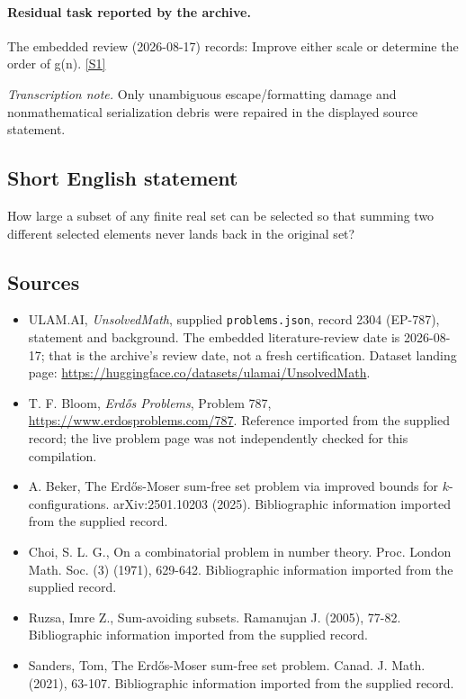 \documentclass[11pt,a4paper]{article}
\newcommand{\sref}[2]{\hyperlink{source:#1:#2}{[S#2]}}
\begin{document}
\paragraph{Residual task reported by the archive.}

The embedded review (2026-08-17) records: Improve either scale or determine the order of g(n). \sref{2304}{1}

{\small\emph{Transcription note.} Only unambiguous escape/formatting damage and nonmathematical serialization debris were repaired in the displayed source statement.}

\subsection{Short English statement}

How large a subset of any finite real set can be selected so that summing two different selected elements never lands back in the original set?

\subsection{Sources}

{\small

\begin{itemize}

\item[\hypertarget{source:2304:1}{S1}] ULAM.AI, \emph{UnsolvedMath}, supplied \texttt{problems.json}, record 2304 (EP-787), statement and background. The embedded literature-review date is 2026-08-17; that is the archive’s review date, not a fresh certification. Dataset landing page: \url{https://huggingface.co/datasets/ulamai/UnsolvedMath}.

\item[\hypertarget{source:2304:2}{S2}] T. F. Bloom, \emph{Erdős Problems}, Problem 787, \url{https://www.erdosproblems.com/787}. Reference imported from the supplied record; the live problem page was not independently checked for this compilation.

\item[\hypertarget{source:2304:3}{S3}] A. Beker, The Erd\H{o}s-Moser sum-free set problem via improved bounds for $k$-configurations. arXiv:2501.10203 (2025). Bibliographic information imported from the supplied record.

\item[\hypertarget{source:2304:4}{S4}] Choi, S. L. G., On a combinatorial problem in number theory. Proc. London Math. Soc. (3) (1971), 629-642. Bibliographic information imported from the supplied record.

\item[\hypertarget{source:2304:5}{S5}] Ruzsa, Imre Z., Sum-avoiding subsets. Ramanujan J. (2005), 77-82. Bibliographic information imported from the supplied record.

\item[\hypertarget{source:2304:6}{S6}] Sanders, Tom, The Erd\H{o}s-Moser sum-free set problem. Canad. J. Math. (2021), 63-107. Bibliographic information imported from the supplied record.

\end{itemize}

}

\label{end:2304}
\end{document}
